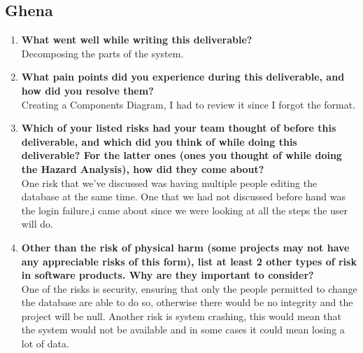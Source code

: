 \documentclass{article}
\begin{document}
\subsection*{Ghena}
\begin{enumerate}
    \item \textbf{What went well while writing this deliverable?}\\
    Decomposing the parts of the system.
    \item \textbf{What pain points did you experience during this deliverable, and how
    did you resolve them?}\\
    Creating a Components Diagram, I had to review it since I forgot the format.
    \item \textbf{Which of your listed risks had your team thought of before this
    deliverable, and which did you think of while doing this deliverable? For
    the latter ones (ones you thought of while doing the Hazard Analysis), how
    did they come about?}\\
    One risk that we've discussed was having multiple people editing the database at the same time. One that we had not discussed before hand was the login failure,i came about since we were looking at all the steps the user will do. 
    \item \textbf{Other than the risk of physical harm (some projects may not have any
    appreciable risks of this form), list at least 2 other types of risk in
    software products. Why are they important to consider?} \\
    One of the risks is security, ensuring that only the people permitted to change the database are able to do so,  otherwise there would be no integrity and the project will be null.
    Another risk is system crashing, this would mean that the system would not be available and in some cases it could mean losing a lot of data. 
  \end{enumerate}
\end{document}
